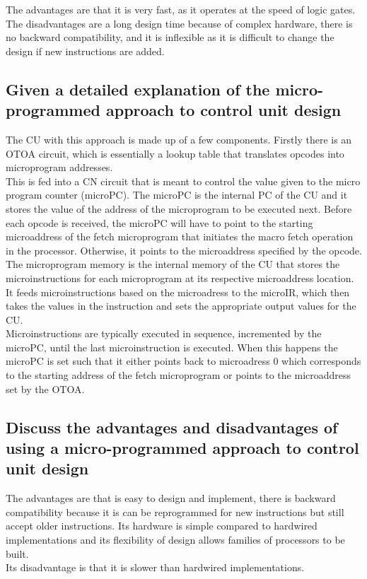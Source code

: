 \documentclass{article}
\begin{document}
The advantages are that it is very fast, as it operates at the speed of logic gates. \\
The disadvantages are a long design time because of complex hardware, there is no backward compatibility, and it is inflexible as it is difficult to change the design if new instructions are added.

\subsection{Given a detailed explanation of the micro-programmed approach to control unit design}

The CU with this approach is made up of a few components. Firstly there is an OTOA circuit, which is essentially a lookup table that translates opcodes into microprogram addresses. \\
This is fed into a CN circuit that is meant to control the value given to the micro program counter (microPC). The microPC is the internal PC of the CU and it stores the value of the address of the microprogram to be executed next. Before each opcode is received, the microPC will have to point to the starting microaddress of the fetch microprogram that initiates the macro fetch operation in the processor. Otherwise, it points to the microaddress specified by the opcode. \\
The microprogram memory is the internal memory of the CU that stores the microinstructions for each microprogram at its respective microaddress location. \\
It feeds microinstructions based on the microadress to the microIR, which then takes the values in the instruction and sets the appropriate output values for the CU. 
\\
Microinstructions are typically executed in sequence, incremented by the microPC, until the last microinstruction is executed. When this happens the microPC is set such that it either points back to microadress 0 which corresponds to the starting address of the fetch microprogram or points to the microaddress set by the OTOA.

\subsection{Discuss the advantages and disadvantages of using a micro-programmed approach to control unit design}

The advantages are that is easy to design and implement, there is backward compatibility because it is can be reprogrammed for new instructions but still accept older instructions. Its hardware is simple compared to hardwired implementations and its flexibility of design allows families of processors to be built. \\
Its disadvantage is that it is slower than hardwired implementations.
\end{document}
